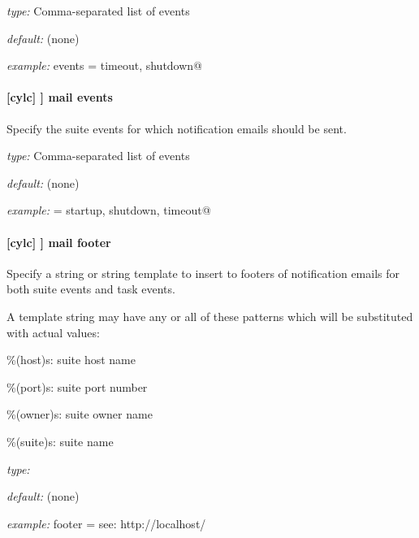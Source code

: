 \begin{myitemize}
    \item {\em type:} Comma-separated list of events
    \item {\em default:} (none)
    \item {\em example:} \lstinline@handler events = timeout, shutdown@
\end{myitemize}

\paragraph[mail events]{[cylc] \textrightarrow [[events]] \textrightarrow mail events}

Specify the suite events for which notification emails should be sent.

\begin{myitemize}
    \item {\em type:} Comma-separated list of events
    \item {\em default:} (none)
    \item {\em example:} \lstinline@handler = startup, shutdown, timeout@
\end{myitemize}

\paragraph[mail footer]{[cylc] \textrightarrow [[events]] \textrightarrow mail footer}

Specify a string or string template to insert to footers of notification emails
for both suite events and task events.

A template string may have any or all of these patterns which will be
substituted with actual values:
\begin{myitemize}
    \item \%(host)s: suite host name
    \item \%(port)s: suite port number
    \item \%(owner)s: suite owner name
    \item \%(suite)s: suite name
\end{myitemize}

\begin{myitemize}
    \item {\em type:} 
    \item {\em default:} (none)
    \item {\em example:} \lstinline@mail footer = see: http://localhost/%(owner)s/notes-on/%(suite)s/@
\end{myitemize}

